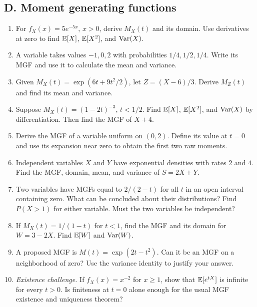 \subsection{D. Moment generating functions}
\begin{enumerate}[label=\textbf{D\arabic*.},leftmargin=*,itemsep=0.75em]
\item For $f_X(x)=5e^{-5x}$, $x>0$, derive $M_X(t)$ and its domain. Use derivatives at zero to find $\mathbb E[X]$, $\mathbb E[X^2]$, and $\operatorname{Var}(X)$.
\item A variable takes values $-1,0,2$ with probabilities $1/4,1/2,1/4$. Write its MGF and use it to calculate the mean and variance.
\item Given $M_X(t)=\exp(6t+9t^2/2)$, let $Z=(X-6)/3$. Derive $M_Z(t)$ and find its mean and variance.
\item Suppose $M_X(t)=(1-2t)^{-3}$, $t<1/2$. Find $\mathbb E[X]$, $\mathbb E[X^2]$, and $\operatorname{Var}(X)$ by differentiation. Then find the MGF of $X+4$.
\item Derive the MGF of a variable uniform on $(0,2)$. Define its value at $t=0$ and use its expansion near zero to obtain the first two raw moments.
\item Independent variables $X$ and $Y$ have exponential densities with rates $2$ and $4$. Find the MGF, domain, mean, and variance of $S=2X+Y$.
\item Two variables have MGFs equal to $2/(2-t)$ for all $t$ in an open interval containing zero. What can be concluded about their distributions? Find $P(X>1)$ for either variable. Must the two variables be independent?
\item If $M_X(t)=1/(1-t)$ for $t<1$, find the MGF and its domain for $W=3-2X$. Find $\mathbb E[W]$ and $\operatorname{Var}(W)$.
\item A proposed MGF is $M(t)=\exp(2t-t^2)$. Can it be an MGF on a neighborhood of zero? Use the variance identity to justify your answer.
\item \textit{Existence challenge.} If $f_X(x)=x^{-2}$ for $x\geq1$, show that $\mathbb E[e^{tX}]$ is infinite for every $t>0$. Is finiteness at $t=0$ alone enough for the usual MGF existence and uniqueness theorem?
\end{enumerate}

